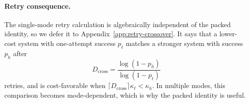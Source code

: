 \documentclass{article}
\newcommand{\cA}{\mathcal{A}}
\newcommand{\cM}{\mathcal{M}}
\begin{document}
\paragraph{Retry consequence.}
The single-mode retry calculation is algebraically independent of the packed identity, so we defer it to Appendix~\ref{app:retry-crossover}.  It says that a lower-cost system with one-attempt success \(p_\ell\) matches a stronger system with success \(p_h\) after
\[
    D_{\mathrm{cross}}=\frac{\log(1-p_h)}{\log(1-p_\ell)}
\]
retries, and is cost-favorable when \(\lceil D_{\mathrm{cross}}\rceil\kappa_\ell<\kappa_h\).  In multiple modes, this comparison becomes mode-dependent, which is why the packed identity is useful.



\end{document}
